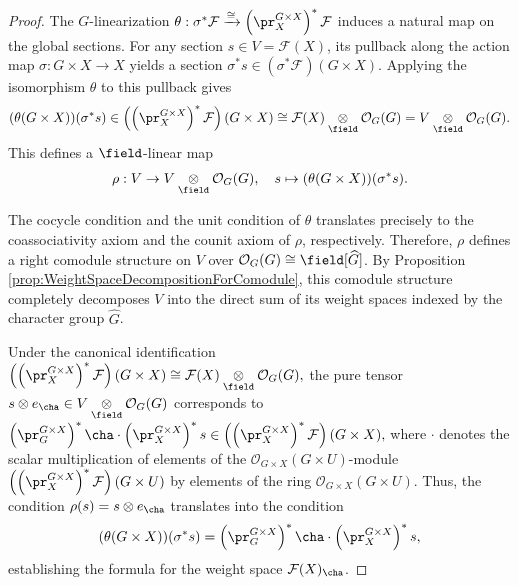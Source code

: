 \begin{proof}
The $G$-linearization $\theta : \sigma^* \mathcal{F} \xrightarrow{\cong} \left(\pr_X^{G \times X}\right)^* \mathcal{F}$ induces a natural map on the global sections.
For any section $s \in V = \mathcal{F}(X)$, its pullback along the action map $\sigma:G\times X \rightarrow X$ yields a section $\sigma^* s \in (\sigma^*\mathcal{F})(G\times X)$.
Applying the isomorphism $\theta$ to this pullback gives
$$
(\theta(G\times X))(\sigma^* s)
\in
\left(\left(\pr_X^{G \times X}\right)^* \mathcal{F}\right)(G\times X)
\cong
\mathcal{F}(X) \underset{\field}{\otimes} \mathcal{O}_G(G)
=
V \underset{\field}{\otimes} \mathcal{O}_G(G).
$$
This defines a $\field$-linear map
$$
\rho
:
V \rightarrow V \underset{\field}{\otimes} \mathcal{O}_G(G),
\quad
s
\mapsto
(\theta(G\times X))(\sigma^* s).
$$


The cocycle condition and the unit condition of $\theta$
translates precisely to the coassociativity axiom
and the counit axiom of $\rho$,
respectively.
Therefore, $\rho$ defines a right comodule structure on $V$ over $\mathcal{O}_G(G) \cong \field[\widehat{G}]$.
By Proposition \ref{prop:WeightSpaceDecompositionForComodule},
this comodule structure completely decomposes $V$ into the direct sum of its weight spaces indexed by the character group $\widehat{G}$.

Under the canonical identification
$
\left(\left(\pr_X^{G \times X}\right)^* \mathcal{F}\right)(G\times X)
\cong
\mathcal{F}(X) \underset{\field}{\otimes} \mathcal{O}_G(G),
$
the pure tensor $s \otimes e_{\cha} \in V \underset{\field}{\otimes} \mathcal{O}_G(G)$ corresponds to
$
\left(\pr_G^{G \times X}\right)^*\cha
\cdot
\left(\pr_X^{G \times X}\right)^* s
\in
\left(\left(\pr_X^{G \times X}\right)^* \mathcal{F}\right)(G\times X),
$
where
$\cdot$ denotes the scalar multiplication of elements of the $\mathcal{O}_{G\times X}(G\times U)$-module
$\left(\left(\pr_X^{G \times X}\right)^*\mathcal{F}\right)(G\times U)$
by elements of the ring $\mathcal{O}_{G\times X}(G\times U)$.
Thus, the condition $\rho(s) = s \otimes e_{\cha}$ translates into the condition
$$
(\theta(G\times X))(\sigma^* s) = \left(\pr_G^{G \times X}\right)^*\cha \cdot \left(\pr_X^{G \times X}\right)^* s,
$$
establishing the formula for the weight space $\mathcal{F}(X)_{\cha}$.
\end{proof}





